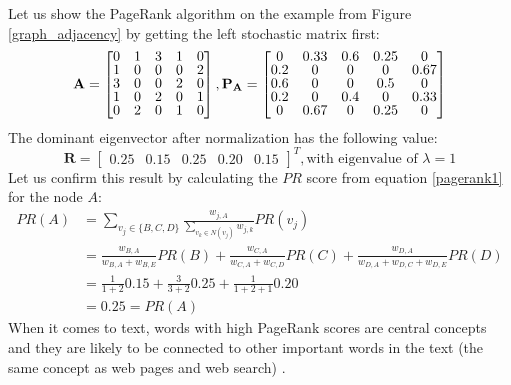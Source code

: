 \documentclass[12pt]{article}
\numberwithin{equation}{section}
\begin{document}
\begin{spacing}{1.5}
	Let us show the PageRank algorithm on the example from Figure \ref{graph_adjacency} by getting the left stochastic matrix first:
	$$
	\mathbf{A} = 
	\renewcommand\arraystretch{0.8} 
	\begin{bmatrix}
			0 & 1 & 3 & 1 & 0 \\
			1 & 0 & 0 & 0 & 2 \\
			3 & 0 & 0 & 2 & 0 \\
			1 & 0 & 2 & 0 & 1 \\
			0 & 2 & 0 & 1 & 0
		\end{bmatrix},
	\mathbf{P}_\mathbf{A} = 
	\renewcommand\arraystretch{0.8} 
	\begin{bmatrix}
		0 & 0.33 & 0.6 & 0.25 & 0 \\
		0.2 & 0 & 0 & 0 & 0.67 \\
		0.6 & 0 & 0 & 0.5 & 0 \\
		0.2 & 0 & 0.4 & 0 & 0.33 \\
		0 & 0.67 & 0 & 0.25 & 0
	\end{bmatrix}
	$$
	The dominant eigenvector after normalization has the following value: 
	$$ \mathbf{R} = \begin{bmatrix}
		0.25 & 0.15 & 0.25 & 0.20 & 0.15
	\end{bmatrix}^T, \text{with eigenvalue of } \lambda = 1 $$
	Let us confirm this result by calculating the $PR$ score from equation \ref{pagerank1} for the node $A$:
	\begin{equation*}
		\begin{split}
			PR(A) & = \sum_{v_j \in \{B, C, D\}} \frac{w_{j, A}}{\sum_{v_k \in N(v_j)} w_{j,k}} PR(v_j) \\
			& = \frac{w_{B,A}}{w_{B,A} + w_{B,E}} PR(B) + \frac{w_{C,A}}{w_{C, A} + w_{C, D}} PR(C) + \frac{w_{D,A}}{w_{D,A} + w_{D, C} + w_{D, E}} PR(D) \\
			& = \frac{1}{1 + 2}0.15 + \frac{3}{3 + 2}0.25 + \frac{1}{1 + 2 + 1}0.20 \\
			& = 0.25 = PR(A)
		\end{split}
	\end{equation*}
	When it comes to text, words with high PageRank scores are central concepts and they are likely to be connected to other important words in the text (the same concept as web pages and web search) \cite{textrank}. 
	

\end{spacing}
\end{document}
